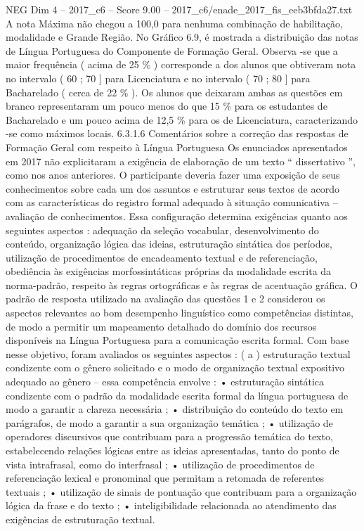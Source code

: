 \begin{textsample}{NEG Dim 4 – 2017\_c6 – Score 9.00 – 2017\_c6/enade\_2017\_fis\_eeb3bfda27.txt}
A nota Máxima não chegou a 100,0 para nenhuma combinação de habilitação, modalidade e Grande Região.
No Gráfico 6.9, é mostrada a distribuição das notas de Língua Portuguesa do Componente de Formação Geral.
Observa -se que a maior frequência ( acima de 25 \% ) corresponde a dos alunos que obtiveram nota no intervalo ( 60 ; 70 ] para Licenciatura e no intervalo ( 70 ; 80 ] para Bacharelado ( cerca de 22 \% ).
Os alunos que deixaram ambas as questões em branco representaram um pouco menos do que 15 \% para os estudantes de Bacharelado e um pouco acima de 12,5 \% para os de Licenciatura, caracterizando -se como máximos locais. 6.3.1.6 Comentários sobre a correção das respostas de Formação Geral com respeito à Língua Portuguesa Os enunciados apresentados em 2017 não explicitaram a exigência de elaboração de um texto “ dissertativo ”, como nos anos anteriores.
O participante deveria fazer uma exposição de seus conhecimentos sobre cada um dos assuntos e estruturar seus textos de acordo com as características do registro formal adequado à situação comunicativa – avaliação de conhecimentos.
Essa configuração determina exigências quanto aos seguintes aspectos : adequação da seleção vocabular, desenvolvimento do conteúdo, organização lógica das ideias, estruturação sintática dos períodos, utilização de procedimentos de encadeamento textual e de referenciação, obediência às exigências morfossintáticas próprias da modalidade escrita da norma-padrão, respeito às regras ortográficas e às regras de acentuação gráfica.
O padrão de resposta utilizado na avaliação das questões 1 e 2 considerou os aspectos relevantes ao bom desempenho linguístico como competências distintas, de modo a permitir um mapeamento detalhado do domínio dos recursos disponíveis na Língua Portuguesa para a comunicação escrita formal.
Com base nesse objetivo, foram avaliados os seguintes aspectos : ( a ) estruturação textual condizente com o gênero solicitado e o modo de organização textual expositivo adequado ao gênero – essa competência envolve : • estruturação sintática condizente com o padrão da modalidade escrita formal da língua portuguesa de modo a garantir a clareza necessária ; • distribuição do conteúdo do texto em parágrafos, de modo a garantir a sua organização temática ; • utilização de operadores discursivos que contribuam para a progressão temática do texto, estabelecendo relações lógicas entre as ideias apresentadas, tanto do ponto de vista intrafrasal, como do interfrasal ; • utilização de procedimentos de referenciação lexical e pronominal que permitam a retomada de referentes textuais ; • utilização de sinais de pontuação que contribuam para a organização lógica da frase e do texto ; • inteligibilidade relacionada ao atendimento das exigências de estruturação textual.

\end{textsample}

